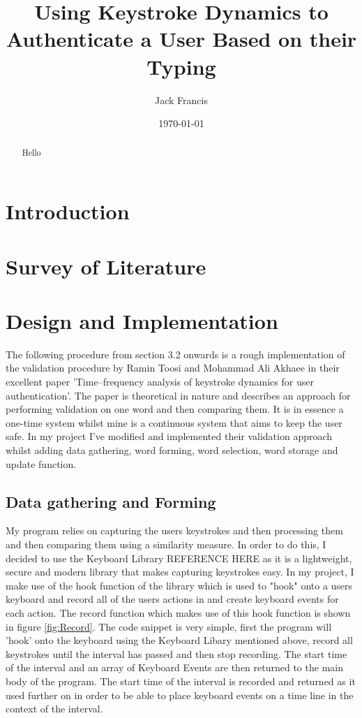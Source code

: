 \documentclass[10pt,a4paper]{report}
\title{Using Keystroke Dynamics to Authenticate a User Based on their Typing}
\author{Jack Francis}
\date{\today}
\begin{document}
\maketitle

\begin{abstract}
Hello
\end{abstract}

\tableofcontents


\chapter{Introduction}
\setcounter{page}{1}

\chapter{Survey of Literature}

\chapter{Design and Implementation}

The following procedure from section 3.2 onwards is a rough implementation of the validation procedure by Ramin Toosi and Mohammad Ali Akhaee in their excellent paper 'Time–frequency analysis of keystroke dynamics for user authentication'. \cite{ToosiRamin2021Taok} The paper is theoretical in nature and describes an approach for performing validation on one word and then comparing them. It is in essence a one-time system whilst mine is a continuous system that aims to keep the user safe. In my project I've modified and implemented their validation approach whilst adding data gathering, word forming, word selection, word storage and update function. 

\section{Data gathering and Forming}
My program relies on capturing the users keystrokes and then processing them and then comparing them using a similarity measure. In order to do this, I decided to use the Keyboard Library REFERENCE HERE as it is a lightweight, secure and modern library that makes capturing keystrokes easy. In my project, I make use of the hook function of the library which is used to "hook" onto a users keyboard and record all of the users actions in and create keyboard events for each action. The record function which makes use of this hook function is shown in figure \ref{fig:Record}. The code snippet is very simple, first the program will 'hook' onto the keyboard using the Keyboard Libary mentioned above, record all keystrokes until the interval has passed and then stop recording. The start time of the interval and an array of Keyboard Events are then returned to the main body of the program. The start time of the interval is recorded and returned as it used further on in order to be able to place keyboard events on a time line in the context of the interval.
\end{document}
